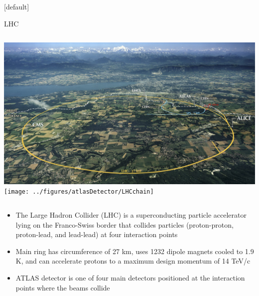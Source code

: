 \documentclass{beamer}
\begin{document}
{  \makeatletter %
  [default]
  \def\beamer@entrycode{\vspace*{-1.075\headheight}}
  \begin{frame}{LHC}
    \vspace{15pt}
    \begin{columns}
      \includegraphics[width=\textwidth]{figures/LHC_map-s}
      \texttt{[image: ../figures/atlasDetector/LHCchain]}
    \end{columns}
    \begin{itemize}\small
      \item The Large Hadron Collider (LHC) is a superconducting particle accelerator lying on the Franco-Swiss border that collides particles (proton-proton, proton-lead, and lead-lead) at four interaction points
      \item Main ring has circumference of 27 km, uses 1232 dipole magnets cooled to 1.9 K, and can accelerate protons to a maximum design momentum of 14 TeV/c
      \item ATLAS detector is one of four main detectors positioned at the interaction points where the beams collide
    \end{itemize}
  \end{frame}

}
\end{document}
